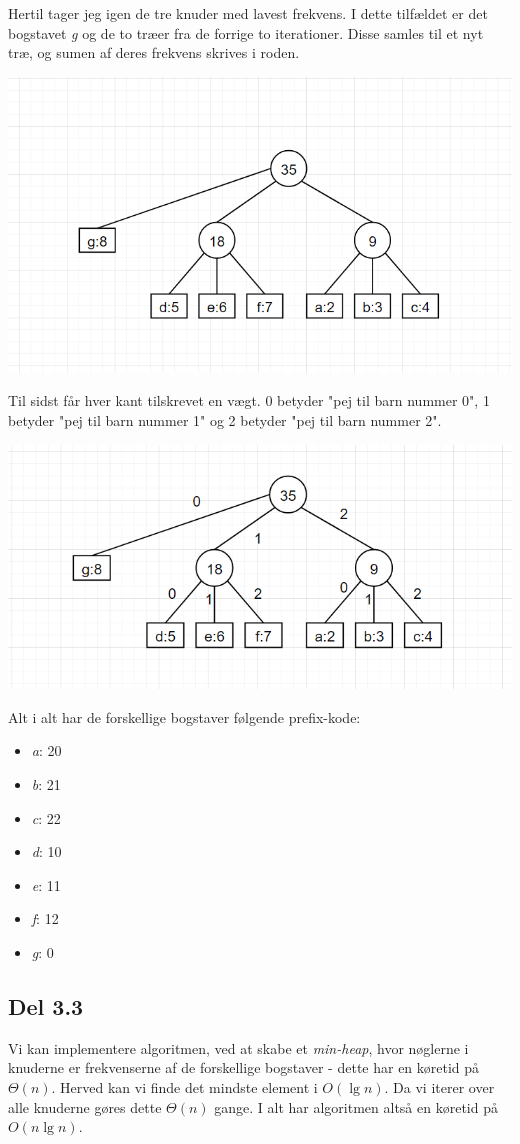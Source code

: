 \documentclass{report}
\begin{document}
Hertil tager jeg igen de tre knuder med lavest frekvens. I dette tilfældet er det bogstavet \textit{g} og de to træer fra de forrige to iterationer. Disse samles til et nyt træ, og sumen af deres frekvens skrives i roden.
\begin{center}
    \includegraphics[height = 5 cm]{../entities/huffman4.PNG}
\end{center}
Til sidst får hver kant tilskrevet en vægt. 0 betyder "pej til barn nummer 0", 1 betyder "pej til barn nummer 1" og 2 betyder "pej til barn nummer 2".
\begin{center}
    \includegraphics[height = 5 cm]{../entities/huffman5.PNG}
\end{center}
Alt i alt har de forskellige bogstaver følgende prefix-kode:
\begin{itemize}
    \item \textit{a}: 20
    \item \textit{b}: 21
    \item \textit{c}: 22
    \item \textit{d}: 10
    \item \textit{e}: 11
    \item \textit{f}: 12
    \item \textit{g}: 0
\end{itemize}

\subsection*{Del 3.3}
Vi kan implementere algoritmen, ved at skabe et \textit{min-heap}, hvor nøglerne i knuderne er frekvenserne af de forskellige bogstaver - dette har en køretid på $\Theta(n)$. Herved kan vi finde det mindste element i $O(\lg n)$. Da vi iterer over alle knuderne gøres dette $\Theta(n)$ gange. I alt har algoritmen altså en køretid på $O(n \lg n)$.
\end{document}
